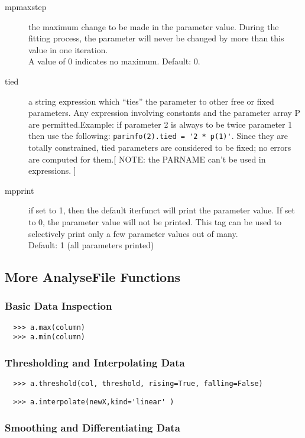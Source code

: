 \documentclass[a4paper,11pt]{scrartcl}
\begin{document}
\begin{description}
  \item[mpmaxstep] the maximum change to be made in the parameter value.  During
the fitting process, the parameter will never be changed by more than this value
in one iteration.\\ A value of 0 indicates no maximum.  Default: 0.
  \item[tied] a string expression which ``ties'' the parameter to other	free or
fixed parameters.  Any expression involving	constants and the parameter
array P are permitted.Example: if parameter 2 is always to be twice parameter 1
then use the following: \verb#parinfo(2).tied = '2 * p(1)'#. Since they are
totally constrained, tied parameters are considered to be fixed; no errors are
computed for them.[ NOTE: the PARNAME can't be used in expressions. ]
  \item[mpprint] if set to 1, then the default iterfunct will print the
parameter value.  If set to 0, the parameter value will not be printed.  This
tag can be used to selectively print only a few parameter values out of
many.\\Default: 1 (all parameters printed)
\end{description}

\subsection{More AnalyseFile Functions}

\subsubsection{Basic Data Inspection}
\begin{verbatim}
  >>> a.max(column)
  >>> a.min(column)
\end{verbatim}

\subsubsection{Thresholding and Interpolating Data}
\begin{verbatim}
  >>> a.threshold(col, threshold, rising=True, falling=False)
\end{verbatim}

\begin{verbatim}
  >>> a.interpolate(newX,kind='linear' )
\end{verbatim}

\subsubsection{Smoothing and Differentiating Data}
\end{document}
